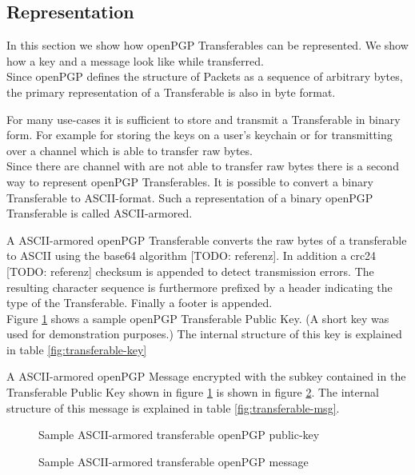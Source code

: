 \subsection{Representation}

In this section we show how openPGP Transferables can be represented. We show how a key and a message look like while transferred. \\

Since openPGP defines the structure of Packets as a sequence of arbitrary bytes, the primary representation of a Transferable is also in byte format.

For many use-cases it is sufficient to store and transmit a Transferable in binary form. For example for storing the keys on a user's keychain or for transmitting over a channel which is able to transfer raw bytes. \\


Since there are channel with are not able to transfer raw bytes there is a second way to represent openPGP Transferables. It is possible to convert a binary Transferable to ASCII-format. Such a representation of a binary openPGP Transferable is called ASCII-armored.

A ASCII-armored openPGP Transferable converts the raw bytes of a transferable to ASCII using the base64 algorithm [TODO: referenz]. In addition a crc24 [TODO: referenz] checksum is appended to detect transmission errors. The resulting character sequence is furthermore prefixed by a header indicating the type of the Transferable. Finally a footer is appended. \\

Figure \ref{fig:key} shows a sample openPGP Transferable Public Key. (A short key was used for demonstration purposes.) The internal structure of this key is explained in table \ref{fig:transferable-key}

A ASCII-armored openPGP Message encrypted with the subkey contained in the Transferable Public Key shown in figure \ref{fig:key} is shown in figure \ref{fig:msg}. The internal structure of this message is explained in table \ref{fig:transferable-msg}. \\

\begin{figure}
	\centering
	
	\caption{Sample ASCII-armored transferable openPGP public-key}
	\label{fig:key}
\end{figure}

\begin{figure}
	\centering
	
	\caption{Sample ASCII-armored transferable openPGP message}
	\label{fig:msg}
\end{figure}


